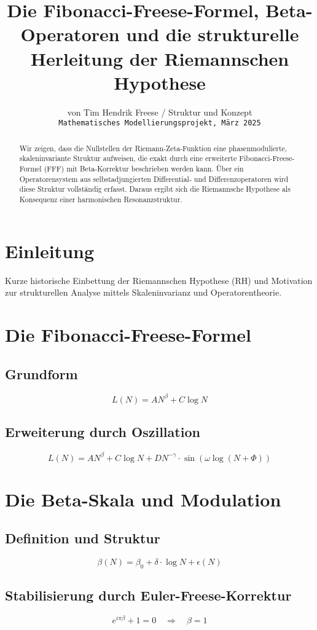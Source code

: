 \documentclass[12pt]{article}
\title{Die Fibonacci-Freese-Formel, Beta-Operatoren und die strukturelle Herleitung der Riemannschen Hypothese}
\author{ von Tim Hendrik  Freese / Struktur und Konzept\\ \smallskip \small \texttt{Mathematisches Modellierungsprojekt, März 2025}}
\date{}
\begin{document}
\maketitle

\begin{abstract}
Wir zeigen, dass die Nullstellen der Riemann-Zeta-Funktion eine phasenmodulierte, skaleninvariante Struktur aufweisen, die exakt durch eine erweiterte Fibonacci-Freese-Formel (FFF) mit Beta-Korrektur beschrieben werden kann. Über ein Operatorensystem aus selbstadjungierten Differential- und Differenzoperatoren wird diese Struktur vollständig erfasst. Daraus ergibt sich die Riemannsche Hypothese als Konsequenz einer harmonischen Resonanzstruktur.
\end{abstract}

\section{Einleitung}
Kurze historische Einbettung der Riemannschen Hypothese (RH) und Motivation zur strukturellen Analyse mittels Skaleninvarianz und Operatorentheorie.

\section{Die Fibonacci-Freese-Formel}
\subsection{Grundform}
\[
L(N) = A N^{\beta} + C \log N
\]
\subsection{Erweiterung durch Oszillation}
\[
L(N) = A N^{\beta} + C \log N + D N^{-\gamma} \cdot \sin\left(\omega \log(N + \Phi)\right)
\]

\section{Die Beta-Skala und Modulation}
\subsection{Definition und Struktur}
\[
\beta(N) = \beta_0 + \delta \cdot \log N + \epsilon(N)
\]
\subsection{Stabilisierung durch Euler-Freese-Korrektur}
\[
e^{i \pi \beta} + 1 = 0 \quad \Rightarrow \quad \beta = 1
\]
\end{document}

